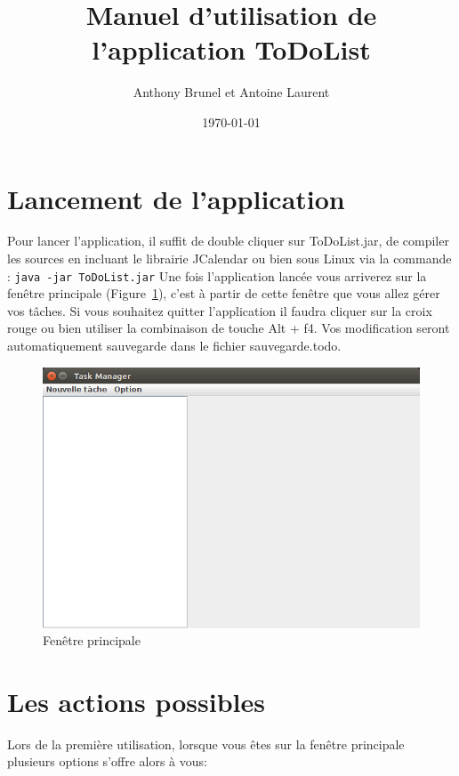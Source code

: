 \documentclass{article}
\title{Manuel d'utilisation de l'application ToDoList}
\author{Anthony Brunel et Antoine Laurent}
\date{\today}
\begin{document}
\maketitle
\newpage
\tableofcontents
\listoffigures
\newpage

\section{Lancement de l'application}
Pour lancer l'application, il suffit de double cliquer sur ToDoList.jar, de compiler les sources en incluant le librairie JCalendar ou bien sous Linux via la commande : \verb+java -jar ToDoList.jar+
\newline
\newline
Une fois l'application lancée vous arriverez sur la fenêtre principale (Figure~\ref{Fenêtre principale}), c'est à partir de cette fenêtre que vous allez gérer vos tâches. 
\newline
Si vous souhaitez quitter l'application il faudra cliquer sur la croix rouge ou bien utiliser la combinaison de touche Alt + f4. Vos modification seront automatiquement sauvegarde dans le fichier sauvegarde.todo.

\begin{figure}[h]
	\centering
	\includegraphics[scale=0.34]{images/MainDIsplay.png}
	\caption{Fenêtre principale}
	\label{Fenêtre principale}
\end{figure}

\section{Les actions possibles}
Lors de la première utilisation, lorsque vous êtes sur la fenêtre principale plusieurs options s'offre alors à vous:
\newline
\end{document}
